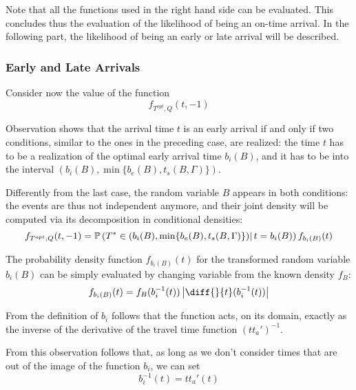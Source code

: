 Note that all the functions used in the right hand side can be evaluated.
This concludes thus the evaluation of the likelihood of being an on-time arrival.
In the following part, the likelihood of being an early or late arrival will be described.

\subsubsection{Early and Late Arrivals}

Consider now the value of the function
\begin{equation*}
  f_{T^{opt}, Q}(t, -1)
\end{equation*}

Observation shows that the arrival time \(t\) is an early arrival if and only if two conditions,
similar to the ones in the preceding case,
are realized:
the time \(t\) has to be a realization of the optimal early arrival time \(b_i(B)\),
and it has to be into the interval \((b_i(B), \min\{b_e(B), t_s(B, \Gamma)\})\).

Differently from the last case, the random variable \(B\) appears in both conditions:
the events are thus not independent anymore,
and their joint density will be computed via its decomposition in conditional densities:
\begin{equation}
  \label{eq:late-joint-decomp}
  f_{T^{opt}, Q}(t, -1) = \mathbb{P}\left(T^* \in (b_i(B), \min\{b_e(B), t_s(B, \Gamma)\})|\, t = b_i(B)\right) f_{b_i(B)}(t)
\end{equation}

The probability density function \(f_{b_i(B)}(t)\) for the transformed random variable \(b_i(B)\) can be simply evaluated by changing variable from the known density \(f_B\):
\begin{equation}
  \label{eq:pdf-b-change-var}
  f_{b_i(B)}(t) = f_B(b_i^{-1}(t)) \left| \diff{}{t}(b_i^{-1}(t)) \right|
\end{equation}

From the definition of \(b_i\) follows that the function acts,
on its domain, exactly as the inverse of the derivative of the travel time function \((tt_a')^{-1}\).

From this observation follows that, as long as we don't consider times that are out of the image of the function \(b_i\),
we can set
\begin{equation*}
  b_i^{-1}(t) = tt_a'(t)
\end{equation*}

